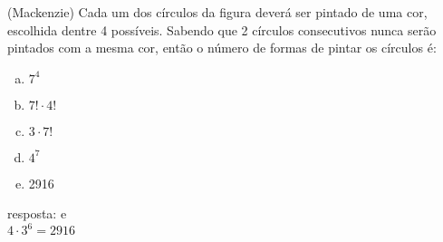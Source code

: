 \begin{ex}
(Mackenzie) Cada um dos círculos da figura deverá ser pintado de uma cor, escolhida dentre 4 possíveis. Sabendo que 2 círculos consecutivos nunca serão pintados com a mesma cor, então o número de formas de pintar os círculos é:
\begin{center}
\end{center}
   \begin{enumerate}[(a)]
   \item $7^4$
   \item $7!\cdot 4!$
   \item $3 \cdot 7!$
   \item $4^7$
   \item 2916
   \end{enumerate}
     \begin{sol}
      resposta: e \\
      $4\cdot3^6=2916$
     \end{sol}
\end{ex}